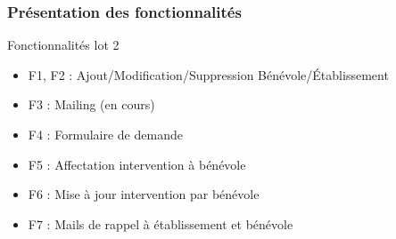 \speaker{\Francois}

\begin{frame}
\frametitle{Présentation des fonctionnalités}
\begin{block}{Fonctionnalités lot 2}
	\begin{itemize}
		\item F1, F2 : Ajout/Modification/Suppression Bénévole/Établissement
		\item F3 : Mailing (en cours)
		\item F4 : Formulaire de demande
		\item F5 : Affectation intervention à bénévole
		\item F6 : Mise à jour intervention par bénévole
		\item F7 : Mails de rappel à établissement et bénévole
	\end{itemize}
\end{block}
\end{frame}
